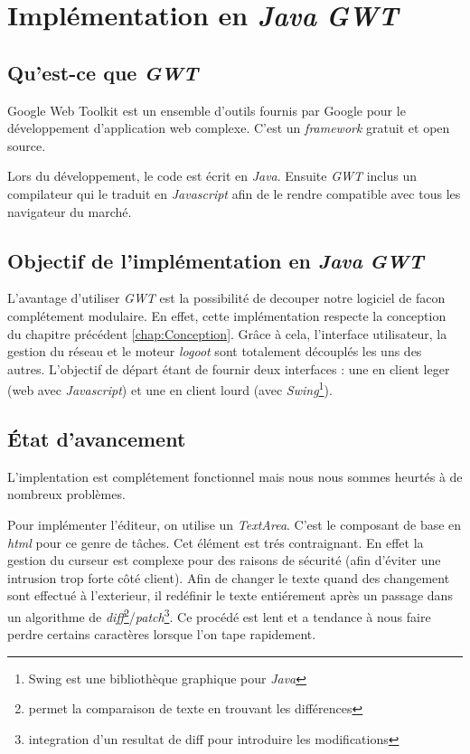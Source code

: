 \section{Implémentation en \emph{Java} \emph{GWT}}
  \label{sec:gwt}
  \subsection{Qu'est-ce que \emph{GWT}}
  Google Web Toolkit est un ensemble d'outils fournis par Google pour le
   développement d'application web complexe. C'est un \emph{framework} gratuit
   et open source.
   
   Lors du développement, le code est écrit en  \emph{Java}. Ensuite \emph{GWT} 
   inclus un compilateur qui le traduit en \emph{Javascript} afin de le rendre 
   compatible avec tous les navigateur du marché.
   
  \subsection{Objectif de l'implémentation en \emph{Java} \emph{GWT}}
  L'avantage d'utiliser \emph{GWT} est la possibilité de decouper notre 
  logiciel de facon complétement modulaire. En effet, cette implémentation respecte la
  conception du chapitre précédent \ref{chap:Conception}. Grâce à cela, 
  l'interface utilisateur, la gestion du réseau et le moteur \emph{logoot}
  sont totalement découplés les uns des autres. L'objectif de départ étant
  de fournir deux interfaces : une en client leger (web avec \emph{Javascript})
  et une en client lourd (avec \emph{Swing}\footnote{Swing est une bibliothèque
  graphique pour \emph{Java}}). 
  
  \subsection{État d'avancement}
	L'implentation est complétement fonctionnel mais nous nous sommes heurtés
	à de nombreux problèmes.
	
	\label{sec:textarea}
	Pour implémenter l'éditeur, on utilise un \emph{TextArea}. C'est le 
	composant de base en \emph{html} pour ce genre de tâches. Cet élément 
	est trés contraignant. En effet la gestion du curseur est complexe
	pour des raisons de sécurité (afin d'éviter une intrusion trop forte côté 
	client). Afin de changer le texte quand des changement sont effectué à 
	l'exterieur, il redéfinir le texte entiérement après un 
	passage dans un algorithme de \emph{diff}\footnote{permet la comparaison 
	de texte en trouvant les différences}/\emph{patch}\footnote{integration
	d'un resultat de diff pour introduire les modifications}. Ce procédé
	est lent et a tendance à nous faire perdre certains caractères lorsque
	l'on tape rapidement.
	
